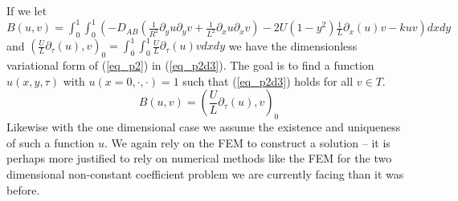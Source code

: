 \documentclass[11pt,fleqn]{article}
\theoremstyle{defstyle}
\begin{document}
If we let $B(u,v) = \int_0^1 \int_0^1 \left(-D_{AB}\left(\frac{1}{R^2}\partial_y u \partial_y v + \frac{1}{L^2}\partial_x u \partial_xv\right) - 2U\left(1-y^2\right)\frac{1}{L}\partial_x(u) v - kuv\right)dxdy$ and $\left(\frac{U}{L} \partial_\tau (u), v\right)_0 = \int_0^1 \int_0^1 \frac{U}{L} \partial_\tau (u) v dxdy$ we have the dimensionless variational form of (\ref{eq_p2}) in (\ref{eq_p2d3}). The goal is to find a function $u(x, y, \tau)$ with $u(x=0,\cdot, \cdot) = 1$ such that (\ref{eq_p2d3}) holds for all $v \in T$.
\begin{equation}
B(u,v) = \left(\frac{U}{L} \partial_\tau (u), v\right)_0
\label{eq_p2d3}
\end{equation}
Likewise with the one dimensional case we assume the existence and uniqueness of such a function $u$. We again rely on the FEM to construct a solution -- it is perhaps more justified to rely on numerical methods like the FEM for the two dimensional non-constant coefficient problem we are currently facing than it was before.
\end{document}
